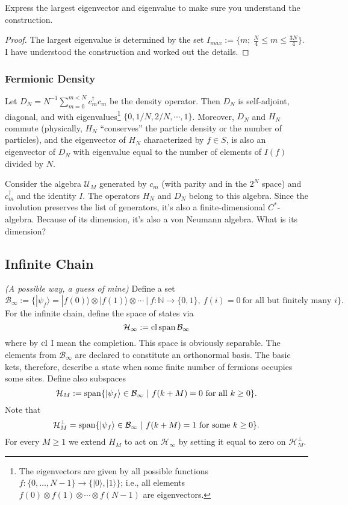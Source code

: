 \begin{exercise}
Express the largest eigenvector and eigenvalue to make sure you understand the construction.
\end{exercise}
\begin{proof}
The largest eigenvalue is determined by the set $I_{max} := \{m; \ \frac{N}{4} \leq m \leq \frac{3N}{4} \}$. I have understood the construction and worked out the details.
\end{proof}
 	 
 	 \subsubsection{Fermionic Density}
 	 Let $D_N=N^{-1}\sum_{m=0}^{m < N} c^\dagger_m c_m$ be the density operator. Then $D_N$ is self-adjoint, diagonal, and
 	 with eigenvalues\footnote{The eigenvectors are given by all possible functions $f:\{0,\ldots,N-1\} \rightarrow \{|0\rangle, |1\rangle\}$; i.e., all elements $f(0) \otimes f(1) \otimes \cdots \otimes f(N-1)$ are eigenvectors.} $\{0, 1/N, 2/N, \cdots, 1\}$. Moreover, $D_N$ and $H_N$ commute (physically, $H_N$ ``conserves'' the particle density
 	 or the number of particles), and the eigenvector of $H_N$ characterized by $f\in S$, is also an eigenvector of $D_N$
 	 with eigenvalue equal to the number of elements of $I(f)$ divided by $N$.
 	 
 	 Consider the algebra $\mathcal{U}_M$ generated by $c_m$ (with parity and in the $2^N$ space) and $c^\dagger_m$ and the identity $I$. The operators $H_N$ and $D_N$ belong to this algebra. Since the involution preserves the list of generators, it's also a finite-dimensional $C^*$-algebra. Because of its dimension, it's also a von Neumann algebra. What is its dimension?
 	 
 	 \subsection{Infinite Chain}
\emph{(A possible way, a guess of mine)} Define a set
\[
\mathcal B_{\infty} := \{|\psi_f\rangle = |f(0)\rangle \otimes |f(1)\rangle \otimes \cdots \ | \ f : \mathbb N \rightarrow \{0, 1\}, \ f(i) = 0 \ \text{for all but finitely many } i\}.
\]
 For the infinite chain, define the space of states via
\[
\mathcal H_{\infty} := \cl \Sp \mathcal B_{\infty} %
\]
where by $\operatorname{cl}$ I mean the completion. This space is obviously separable. The elements from $\mathcal B_{\infty}$ are declared to constitute an orthonormal basis. The basic kets, therefore, describe a state when some finite number of fermions occupies some sites. Define also subspaces
\[
\mathcal H_{M} := \operatorname{span} \{ |\psi_f\rangle \in \mathcal B_{\infty} \ | \ f(k+M) = 0 \ \text{for all} \ k \geq 0\}.
\]
Note that
\[
\mathcal H_{M}^{\perp} = \operatorname{span} \{ |\psi_f\rangle \in \mathcal B_{\infty} \ | \ f(k+M) = 1  \ \text{for some} \ k \geq 0\}.
\]
 	For every $M\ge 1$ we extend $H_M$ to act on $\mathcal{H}_\infty$ by setting it equal to zero on $\mathcal H_{M}^{\perp}$.
	

